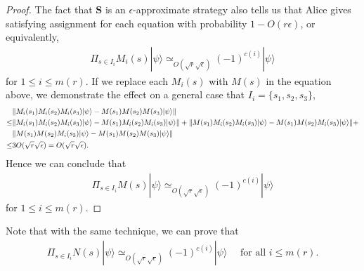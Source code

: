 \documentclass[11pt,letterpaper]{article}
\newcommand{\ket}[1]{|#1\rangle}
\DeclarePairedDelimiter{\norm}{\lVert}{\rVert}
\newcommand{\1}{\mathbb{1}}
\newcommand{\mr}{m(r)}
\newcommand{\bS}{\pmb{S}}
\newcommand{\ep}{\epsilon}
\newcommand{\se}{\sqrt{\epsilon}}
\newcommand{\sr}{\sqrt{r}}
\newcommand{\appd}[1]{\simeq_{#1}}
\theoremstyle{definition}
\begin{document}
\begin{proof}
The fact that $\bS$ is an $\ep$-approximate strategy also tells us that
Alice gives satisfying assignment for each equation with probability $1 - O(r\ep)$,
or equivalently,
\begin{align*}
	\Pi_{s \in I_i} M_{i}(s) \ket{\psi} \appd{O(\sr\se)} (-1)^{c(i)} \ket{\psi}
\end{align*}
for $1 \leq i \leq \mr$.
If we replace each $M_{i}(s)$ with $M(s)$ in the equation above, we demonstrate the effect on a
general case that $I_i = \{s_1, s_2, s_3\}$,
\begin{align*}
	&\norm{ M_{i}(s_1)M_{i}(s_2)M_{i}(s_3) \ket{\psi} - M(s_1)M(s_2)M(s_3) \ket{\psi}}\\
	\leq & \norm{M_{i}(s_1)M_{i}(s_2)M_{i}(s_3)\ket{\psi} - M(s_1)M_{i}(s_2)M_{i}(s_3) \ket{\psi}}+
	\norm{M(s_1)M_{i}(s_2)M_{i}(s_3) \ket{\psi} - M(s_1)M(s_2)M_{i}(s_3) \ket{\psi}} +\\
	&\norm{M(s_1)M(s_2)M_{i}(s_3) \ket{\psi} - M(s_1)M(s_2)M(s_3) \ket{\psi}}\\
	\leq &3O(\sr\se) = O(\sr\se).
\end{align*}
Hence we can conclude that 
\begin{align*}
	\Pi_{s \in I_i} M(s) \ket{\psi} \appd{O(\sr\se)} (-1)^{c(i)}\ket{\psi}
\end{align*}
for $1 \leq i \leq \mr$.
\end{proof}
Note that with the same technique, we can prove that 
\begin{align*}
	\Pi_{s \in I_i} N(s) \ket{\psi} \appd{O(\sr\se)} (-1)^{c(i)}\ket{\psi} \quad \text{ for all } i \leq \mr.
\end{align*}
\end{document}
